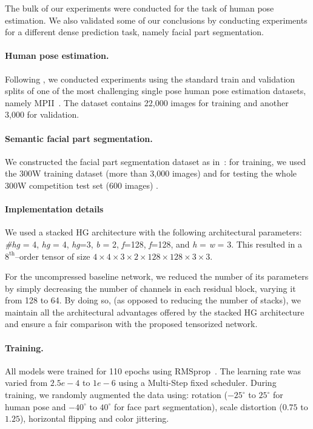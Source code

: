\documentclass[10pt,twocolumn,letterpaper]{article}
\begin{document}
The bulk of our experiments were conducted for the task of human pose estimation. We also validated some of our conclusions by conducting experiments for a different dense prediction task, namely facial part segmentation. 

\paragraph{Human pose estimation.} Following \cite{tompson2014joint}, we conducted experiments using the standard train and validation splits of one of the most challenging single pose human pose estimation datasets, namely MPII~\cite{andriluka20142d}. The dataset contains 22,000 images for training and another 3,000 for validation.

\paragraph{Semantic facial part segmentation.} We constructed the facial part segmentation dataset as in~\cite{bulat2017binarized}: for training, we used the 300W training dataset (more than 3,000 images) and for testing  the whole 300W competition test set (600 images) \cite{sagonas2013300}.

\paragraph{Implementation details}
We used a stacked HG architecture with the following architectural parameters: \emph{\#hg} = 4, \emph{hg} = 4,  \emph{hg}=3, \emph{b} = 2, \emph{f}=128, \emph{f}=128, and \emph{h} = \emph{w} = 3.  This resulted in a \(8^{\text{th}}\)--order tensor of size \(4 \times 4 \times 3 \times 2 \times 128 \times 128 \times 3 \times 3\). 

For the uncompressed baseline network, we reduced the number of its parameters by simply decreasing the number of channels in each residual block, varying it from 128 to 64. By doing so, (as opposed to reducing the number of stacks), we maintain all the architectural advantages offered by the stacked HG architecture and ensure a fair comparison with the proposed tensorized network.

\paragraph{Training.} All models were trained for 110 epochs using \mbox{RMSprop}~\cite{tieleman2012lecture}. The learning rate was varied from $2.5e-4$ to $1e-6$ using a Multi-Step fixed scheduler. During training, we randomly augmented the data using: rotation ($-25^\circ$ to $25^\circ$ for human pose and $-40^\circ$ to $40^\circ$ for face part segmentation), scale distortion ($0.75$ to $1.25$), horizontal flipping and color jittering. 
\end{document}
